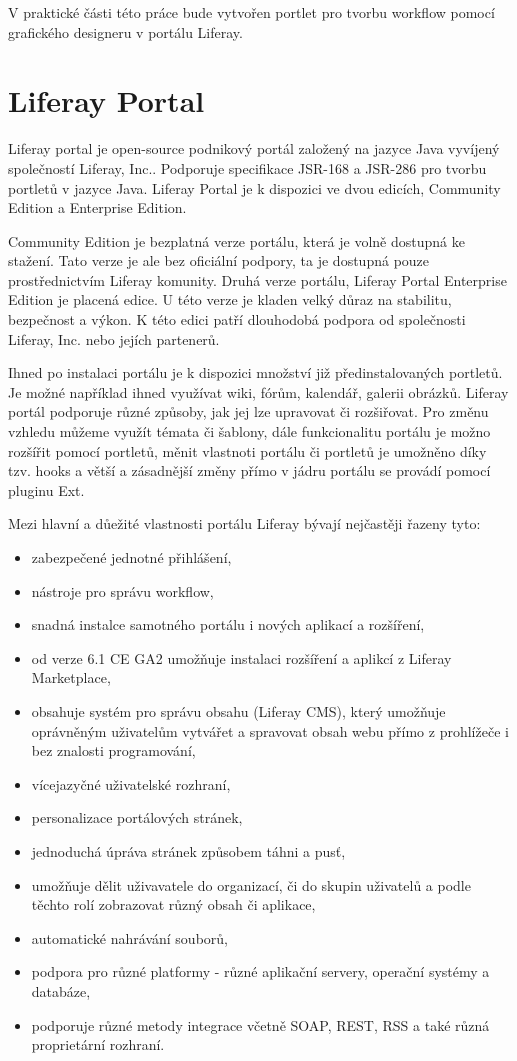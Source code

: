 \documentclass{fithesis}
\begin{document}
V praktické části této práce bude vytvořen portlet pro tvorbu workflow pomocí grafického designeru v portálu Liferay.

\section{Liferay Portal}
Liferay portal je open-source podnikový portál založený na jazyce Java vyvíjený společností Liferay, Inc.. Podporuje specifikace JSR-168 a JSR-286 pro tvorbu portletů v jazyce Java. Liferay Portal je k dispozici ve dvou edicích, Community Edition a Enterprise Edition.

Community Edition je bezplatná verze portálu, která je volně dostupná ke stažení. Tato verze je ale bez oficiální podpory, ta je dostupná pouze prostřednictvím Liferay komunity. Druhá verze portálu, Liferay Portal Enterprise Edition je placená edice. U této verze je kladen velký důraz na stabilitu, bezpečnost a výkon. K této edici patří dlouhodobá podpora od společnosti Liferay, Inc. nebo jejích partenerů.

Ihned po instalaci portálu je k dispozici množství již předinstalovaných portletů. Je možné například ihned využívat wiki, fórům, kalendář, galerii obrázků. Liferay portál podporuje různé způsoby, jak jej lze upravovat či rozšiřovat. Pro změnu vzhledu můžeme využít témata či šablony, dále funkcionalitu portálu je možno rozšířit pomocí portletů, měnit vlastnoti portálu či portletů je umožněno díky tzv. hooks a větší a zásadnější změny přímo v jádru portálu se provádí pomocí pluginu Ext. \cite{developer-guide}

Mezi hlavní a důežité vlastnosti portálu Liferay bývají nejčastěji řazeny tyto: \cite{liferay-features}
\begin{itemize}
\item zabezpečené jednotné přihlášení,
\item nástroje pro správu workflow,
\item snadná instalce samotného portálu i nových aplikací a rozšíření,
\item od verze 6.1 CE GA2 umožňuje instalaci rozšíření a aplikcí z Liferay Marketplace,
\item obsahuje systém pro správu obsahu (Liferay CMS), který umožňuje oprávněným uživatelům vytvářet a spravovat obsah webu přímo z prohlížeče i bez znalosti programování,
\item vícejazyčné uživatelské rozhraní,
\item personalizace portálových stránek,
\item jednoduchá úpráva stránek způsobem táhni a pusť,
\item umožňuje dělit uživavatele do organizací, či do skupin uživatelů a podle těchto rolí zobrazovat různý obsah či aplikace,
\item automatické nahrávání souborů,
\item podpora pro různé platformy - různé aplikační servery, operační systémy a databáze,
\item podporuje různé metody integrace včetně SOAP, REST, RSS a také různá proprietární rozhraní.
\end{itemize}
\end{document}
